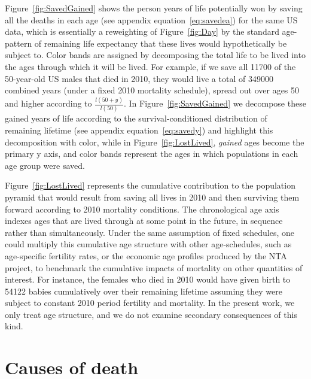 \documentclass{article}
\begin{document}
Figure~\ref{fig:SavedGained} shows the person years of life potentially won by
saving all the deaths in each age (see appendix
equation~\eqref{eq:savedea}) for the same US data, which is essentially a
reweighting of Figure~\ref{fig:Day} by the standard age-pattern of remaining
life expectancy that these lives would hypothetically be subject to.
Color bands are assigned by decomposing the total life to be lived into the ages through which it will be lived. For example, if we save all 11700 of the 50-year-old US
males that died in 2010, they would live a total of 349000 combined years (under
a fixed 2010 mortality schedule), spread out over ages 50
and higher according to $\frac{l(50+y)}{l(50)}$. In Figure~\ref{fig:SavedGained}
we decompose these gained years of life according to the survival-conditioned
distribution of remaining lifetime (see appendix
equation~\eqref{eq:savedy}) and highlight this decomposition with color, while in Figure~\ref{fig:LostLived}, \textit{gained} ages become the primary y axis, and color bands represent the ages in which populations in each age group were saved.

Figure~\ref{fig:LostLived} represents the cumulative contribution to the
population pyramid that would result from saving all lives in 2010 and then
surviving them forward according to 2010 mortality conditions. The chronological
age axis indexes ages that are lived through at some point in the
future, in sequence rather than simultaneously. Under the same assumption of
fixed schedules, one could multiply this cumulative age structure with other
age-schedules, such as age-specific fertility rates, or the economic age profiles produced by
the NTA project, to benchmark the cumulative impacts of mortality on other
quantities of interest. For instance, the females
who died in 2010 would have given birth to 54122 babies cumulatively over their
remaining lifetime assuming they were subject to constant 2010 period fertility
 and mortality. In the present work, we only treat age
structure, and we do not examine secondary consequences of this kind. 

\section*{Causes of death}
\end{document}
